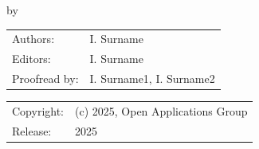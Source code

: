 \begin{titlepage}

\begin{center}

{\makeatletter
\largetitlestyle\fontsize{45}{45}\selectfont\@title
\makeatother}

{\makeatletter
\ifdefvoid{\@subtitle}{}{\bigskip\titlestyle\fontsize{20}{20}\selectfont\@subtitle}
\makeatother}

\bigskip
\bigskip

by

\bigskip
\bigskip

{\makeatletter
\largetitlestyle\fontsize{25}{25}\selectfont\@author
\makeatother}

\bigskip
\bigskip

\setlength\extrarowheight{2pt}

\vfill

\begin{tabular}{ll}
    Authors: & I. Surname \\
    Editors: & I. Surname \\
    Proofread by: &  I. Surname1, I. Surname2
\end{tabular}

\bigskip
\bigskip

\begin{tabular}{p{15mm}p{10cm}}
    Copyright: & (c) 2025, Open Applications Group   \\
    Release:  & 2025
\end{tabular}

\end{center}


\end{titlepage}

